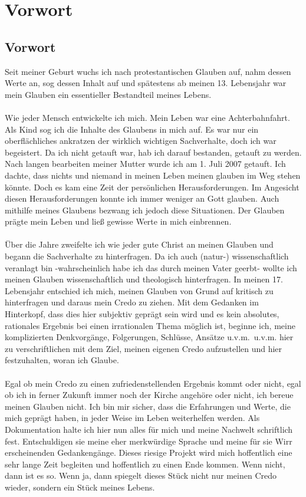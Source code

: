 \part{Vorwort}
\chapter*{Vorwort}
Seit meiner Geburt wuchs ich nach protestantischen Glauben auf, nahm dessen Werte an, sog dessen Inhalt auf und spätestens ab meinen 13. Lebensjahr war mein Glauben ein essentieller Bestandteil meines Lebens.
\\~\\
Wie jeder Mensch entwickelte ich mich. Mein Leben war eine Achterbahnfahrt. Als Kind sog ich die Inhalte des Glaubens in mich auf. Es war nur ein oberflächliches ankratzen der wirklich wichtigen Sachverhalte, doch ich war begeistert. Da ich nicht getauft war, hab ich darauf bestanden, getauft zu werden. Nach langen bearbeiten meiner Mutter wurde ich am 1. Juli 2007 getauft. Ich dachte, dass nichts und niemand in meinen Leben meinen glauben im Weg stehen könnte. Doch es kam eine  Zeit der persönlichen Herausforderungen. Im Angesicht diesen Herausforderungen konnte ich immer weniger an Gott glauben. Auch mithilfe meines Glaubens bezwang ich jedoch diese Situationen. Der Glauben prägte mein Leben und ließ gewisse Werte in mich einbrennen.
\\~\\
Über die Jahre zweifelte ich wie jeder gute Christ an meinen Glauben und begann die Sachverhalte zu hinterfragen. Da ich auch (natur-) wissenschaftlich veranlagt bin  -wahrscheinlich habe ich das durch meinen Vater geerbt- wollte ich meinen Glauben wissenschaftlich und theologisch hinterfragen. In meinen 17. Lebensjahr entschied ich mich, meinen Glauben von Grund auf kritisch zu hinterfragen und daraus mein Credo zu ziehen. Mit dem Gedanken im Hinterkopf, dass dies hier subjektiv geprägt sein wird und es kein absolutes, rationales Ergebnis bei einen irrationalen Thema möglich ist, beginne ich, meine komplizierten Denkvorgänge, Folgerungen, Schlüsse, Ansätze u.v.m.\ u.v.m. hier zu verschriftlichen mit dem Ziel, meinen eigenen Credo aufzustellen und hier festzuhalten, woran ich Glaube.
\\~\\
Egal ob mein Credo zu einen zufriedenstellenden Ergebnis kommt oder nicht, egal ob ich in ferner Zukunft immer noch der Kirche angehöre oder nicht, ich bereue meinen Glauben nicht. Ich bin mir sicher, dass die Erfahrungen und Werte, die mich geprägt haben, in jeder Weise im Leben weiterhelfen werden. Als Dokumentation halte ich hier nun alles für mich und meine Nachwelt schriftlich fest. Entschuldigen sie meine eher merkwürdige Sprache und meine für sie Wirr erscheinenden Gedankengänge. Dieses riesige Projekt wird mich hoffentlich eine sehr lange Zeit begleiten und hoffentlich zu einen Ende kommen. Wenn nicht, dann ist es so. Wenn ja, dann spiegelt dieses Stück nicht nur meinen Credo wieder, sondern ein Stück meines Lebens.
